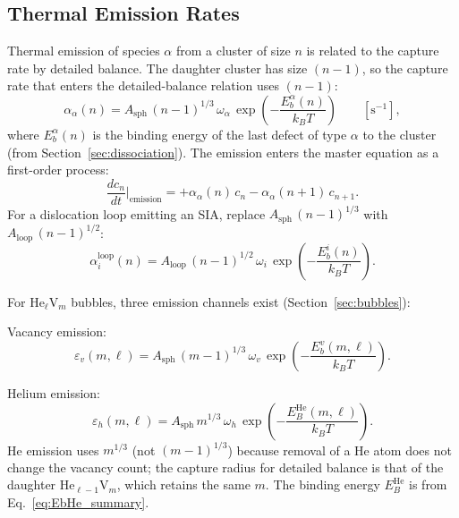 \subsection{Thermal Emission Rates}
\label{sec:emission_rates}

Thermal emission of species $\alpha$ from a cluster of size $n$ is related to
the capture rate by detailed balance. The daughter cluster has size $(n-1)$, so
the capture rate that enters the detailed-balance relation uses $(n-1)$:
\begin{equation}\label{eq:emission}
    \alpha_\alpha(n)
    = A_{\mathrm{sph}}\,(n-1)^{1/3}\,\omega_\alpha\,
      \exp\!\left(-\frac{E_b^\alpha(n)}{k_BT}\right)
    \qquad [\text{s}^{-1}],
\end{equation}
where $E_b^\alpha(n)$ is the binding energy of the last defect of type $\alpha$
to the cluster (from Section~\ref{sec:dissociation}). The emission enters the
master equation as a first-order process:
\begin{equation}\label{eq:emission_master}
    \frac{dc_n}{dt}\bigg|_{\text{emission}}
    = +\alpha_\alpha(n)\,c_n - \alpha_\alpha(n+1)\,c_{n+1}.
\end{equation}
For a dislocation loop emitting an SIA, replace $A_{\mathrm{sph}}\,(n-1)^{1/3}$
with $A_{\mathrm{loop}}\,(n-1)^{1/2}$:
\begin{equation}\label{eq:emission_loop}
    \alpha_i^{\mathrm{loop}}(n)
    = A_{\mathrm{loop}}\,(n-1)^{1/2}\,\omega_i\,
      \exp\!\left(-\frac{E_b^i(n)}{k_BT}\right).
\end{equation}

For He$_\ell$V$_m$ bubbles, three emission channels exist
(Section~\ref{sec:bubbles}):

Vacancy emission:
\begin{equation}\label{eq:emit_v_bubble}
    \varepsilon_v(m,\ell)
    = A_{\mathrm{sph}}\,(m-1)^{1/3}\,\omega_v\,
      \exp\!\left(-\frac{E_b^v(m,\ell)}{k_BT}\right).
\end{equation}

Helium emission:
\begin{equation}\label{eq:emit_He_bubble}
    \varepsilon_h(m,\ell)
    = A_{\mathrm{sph}}\,m^{1/3}\,\omega_h\,
      \exp\!\left(-\frac{E_B^{\mathrm{He}}(m,\ell)}{k_BT}\right).
\end{equation}
He emission uses $m^{1/3}$ (not $(m{-}1)^{1/3}$) because removal of a He
atom does not change the vacancy count; the capture radius for detailed
balance is that of the daughter He$_{\ell-1}$V$_m$, which retains the same
$m$.  The binding energy $E_B^{\mathrm{He}}$ is from
Eq.~\eqref{eq:EbHe_summary}.

